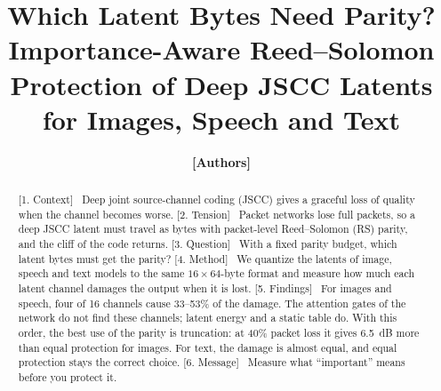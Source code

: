 \documentclass[journal]{IEEEtran}
\providecommand{\TBD}[1]{\textbf{\color{red}[#1]}}
\newcommand{\beat}[1]{\noindent\textcolor{blue!60!black}{\textsf{\footnotesize [#1]}}\ }
\begin{document}
\title{Which Latent Bytes Need Parity? Importance-Aware Reed--Solomon Protection of Deep JSCC Latents
for Images, Speech and Text}
\author{\TBD{Authors}}
\maketitle


\begin{abstract}
\beat{1. Context}
Deep joint source-channel coding (JSCC) gives a graceful loss of quality when the channel becomes worse.
\beat{2. Tension}
Packet networks lose full packets, so a deep JSCC latent must travel as bytes with packet-level
Reed--Solomon (RS) parity, and the cliff of the code returns.
\beat{3. Question}
With a fixed parity budget, which latent bytes must get the parity?
\beat{4. Method}
We quantize the latents of image, speech and text models to the same $16\times64$-byte format and measure
how much each latent channel damages the output when it is lost.
\beat{5. Findings}
For images and speech, four of 16 channels cause 33--53\% of the damage. The attention gates of the
network do not find these channels; latent energy and a static table do. With this order, the best use
of the parity is truncation: at 40\% packet loss it gives 6.5~dB more than equal protection for images.
For text, the damage is almost equal, and equal protection stays the correct choice.
\beat{6. Message}
Measure what ``important'' means before you protect it.
\end{abstract}
\end{document}
